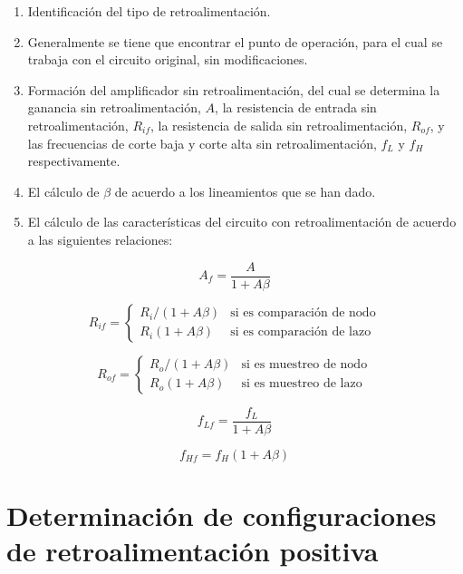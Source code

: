 \begin{enumerate}
	\item Identificación del tipo de retroalimentación.
	\item Generalmente se tiene que encontrar el punto de operación, para el cual se trabaja con el circuito original, sin modificaciones.
	\item Formación del amplificador sin retroalimentación, del cual se determina la ganancia sin retroalimentación, \( A \), la resistencia de entrada sin retroalimentación, \( R_{if} \), la resistencia de salida sin retroalimentación, \( R_{of} \), y las frecuencias de corte baja y corte alta sin retroalimentación, \( f_L \) y \( f_H \) respectivamente.
	\item El cálculo de \( \beta \) de acuerdo a los lineamientos que se han dado.
	\item El cálculo de las características del circuito con retroalimentación de acuerdo a las siguientes relaciones:
\end{enumerate}

\begin{equation}
	A_f = \frac{A}{1 + A\beta}
\end{equation}

\begin{equation}
	R_{if} =
	\begin{cases} 
		R_i/(1 + A\beta) & \text{si es comparación de nodo} \\
		R_i(1 + A\beta) & \text{si es comparación de lazo}
	\end{cases}
\end{equation}

\begin{equation}
	R_{of} =
	\begin{cases} 
		R_o/(1 + A\beta) & \text{si es muestreo de nodo} \\
		R_o(1 + A\beta) & \text{si es muestreo de lazo}
	\end{cases}
\end{equation}

\begin{equation}
	f_{Lf} = \frac{f_L}{1 + A\beta}
\end{equation}

\begin{equation}
	f_{Hf} = f_H (1 + A\beta)
\end{equation}

\section{Determinación de configuraciones de retroalimentación positiva} %

